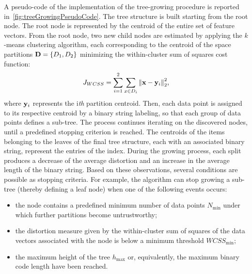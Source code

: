 A pseudo-code of the implementation of the tree-growing procedure is reported in~\ref{fig:treeGrowingPseudoCode}.
The tree structure is built starting from the root node. 
The root node is represented by the centroid of the entire set of feature vectors. From the root node, two new child nodes are estimated by applying the \mbox{$k$-means} clustering algorithm, each corresponding to the centroid of the space partitions ${\bf{D}} = \left\{ {{D_1},{D_2}} \right\}$ minimizing the within-cluster sum of squares cost function:
\begin{equation}
	{J_{WCSS}} = \sum\limits_{i = 1}^2 {\sum\limits_{x \in {D_i}}^{} {\left\| {{\bf{x}} - {{\bf{y }}_i}} \right\|_2^2} } \text{,}
\end{equation}
where ${{\bf{y}}_i}$ represents the i\emph{th} partition centroid. Then, each data point is assigned to its respective centroid by a binary string labeling, so that each group of data points defines a sub-tree.
The process continues iterating on the discovered nodes, until a predefined stopping criterion is reached.
The centroids of the items belonging to the leaves of the final tree structure, each with an associated binary string, represent the entries of the index.
During the growing process, each split produces a decrease of the average distortion and an increase in the average length of the binary string.
Based on these observations, several conditions are possible as stopping criteria.
For example, the algorithm can stop growing a sub-tree (thereby defining a leaf node) when one of the following events occurs:
\begin{itemize}
	\item the node contains a predefined minimum number of data points ${N_{\min }}$ under which further partitions become untrustworthy;
	\item the distortion measure given by the within-cluster sum of squares of the data vectors associated with the node is below a minimum threshold $WCSS_{\min }$;
	\item the maximum height of the tree ${h_{\max }}$ or, equivalently, the maximum binary code length have been reached.
\end{itemize}




















